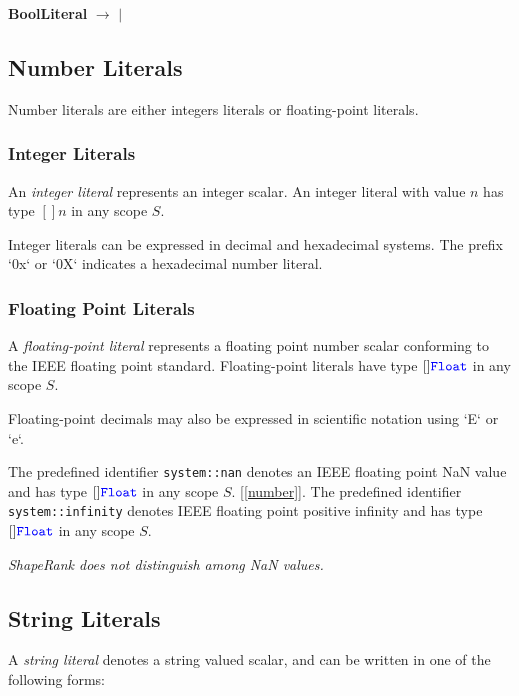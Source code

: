 \documentclass{article}
\begin{document}
{\bf BoolLiteral} $\rightarrow$ \TRUE{} $|$ \FALSE{}

\subsection{Number Literals}
\label{numberLiterals}

Number literals are either integers literals or floating-point literals.

\NumberLiteral{}

\subsubsection{Integer Literals}
\label{integerLiterals}

An {\em integer literal} represents an integer scalar.  An integer literal with value $n$ has type $[]n{}$ in any scope $S$.

Integer literals can be expressed in decimal and hexadecimal systems. The prefix `0x` or `0X` indicates a hexadecimal number literal. 

\subsubsection{Floating Point Literals}
\label{floatingPointLiterals}

A {\em floating-point literal} represents a floating point number scalar conforming to the IEEE floating point standard. Floating-point literals have type $[]\texttt{\color{blue} Float}{}$ in any scope $S$.

Floating-point decimals may also be expressed in scientific notation using `E` or `e`.

The predefined identifier {\tt system::nan}  denotes an IEEE floating point NaN value and has type $[]\texttt{\color{blue} Float}{}$ in any scope $S$. 
[\ref{number}].
The predefined identifier {\tt system::infinity} denotes IEEE floating point positive infinity and has type $[]\texttt{\color{blue} Float}{}$ in any scope $S$.

{\em
ShapeRank does not distinguish among NaN values.
}


\subsection{String Literals}
\label{stringLiterals}

A {\em string literal} denotes a string valued scalar, and can be written in one of the following forms:

\StringLiteral{}
\end{document}
